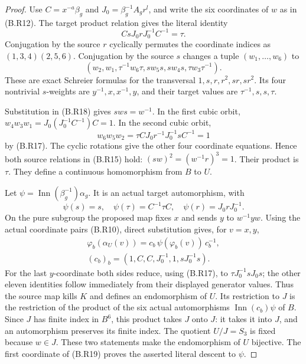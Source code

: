\begin{proof}
Use $C=x^{-a}\beta_g$ and $J_0=\beta_g^{-1}A_g r^l$, and
write the six coordinates of $w$ as in (B.R12).  The target
product relation gives the literal identity
\[
                     C s J_0 r J_0^{-1}C^{-1}=\tau.            \tag{B.R17}
\]
Conjugation by the source $r$ cyclically permutes the
coordinate indices as $(1,3,4)(2,5,6)$.  Conjugation by
the source $s$ changes a tuple $(w_1,\ldots,w_6)$ to
\[
 (w_2,w_1,\tau^{-1}w_6\tau,
                  sw_5s,sw_4s,\tau w_3\tau^{-1}).             \tag{B.R18}
\]
These are exact Schreier formulas for the transversal
$1,s,r,r^2,sr,sr^2$.  Its four nontrivial $s$-weights are
$y^{-1},x,x^{-1},y$, and their target values are
$\tau^{-1},s,s,\tau$.

Substitution in (B.R18) gives
$sws=w^{-1}$.  In the first cubic orbit,
$w_4w_3w_1=J_0(J_0^{-1}C^{-1})C=1$.
In the second cubic orbit,
\[
 w_6w_5w_2
    =\tau C J_0r^{-1}J_0^{-1}sC^{-1}=1
\]
by (B.R17).  The cyclic rotations give the other four
coordinate equations.  Hence both source relations in
(B.R15) hold: $(sw)^2=(w^{-1}r)^3=1$.  Their product is
$\tau$.  They define a continuous homomorphism from $B$
to $U$.

Let $\psi=\operatorname{Inn}(\beta_g^{-1})\alpha_g$.
It is an actual target automorphism, with
\[
 \psi(s)=s,\quad\psi(\tau)=C^{-1}\tau C,\quad
 \psi(r)=J_0rJ_0^{-1}.
\]
On the pure subgroup the proposed map fixes $x$ and sends
$y$ to $w^{-1}yw$.  Using the actual coordinate pairs
(B.R10), direct substitution gives, for $v=x,y$,
\[
\begin{gathered}
 \varphi_b(\alpha_U(v))
      =c_b\,\psi(\varphi_b(v))\,c_b^{-1},\\
 (c_b)_b=(1,C,C,J_0^{-1},1,sJ_0^{-1}s).
\end{gathered}                                                 \tag{B.R19}
\]
For the last $y$-coordinate both sides reduce, using
(B.R17), to $\tau J_0^{-1}sJ_0s$; the other eleven
identities follow immediately from their displayed
generator values.  Thus the source map kills $K$ and
defines an endomorphism of $U$.  Its restriction to $J$
is the restriction of the product of the six actual
automorphisms $\operatorname{Inn}(c_b)\psi$ of $B$.
Since $J$ has finite index in $B^6$, this product takes
$J$ onto $J$: it takes it into $J$, and an automorphism
preserves its finite index.  The quotient $U/J=S_3$ is
fixed because $w\in J$.  These two statements make the
endomorphism of $U$ bijective.  The first coordinate of
(B.R19) proves the asserted literal descent to $\psi$.


\end{proof}
